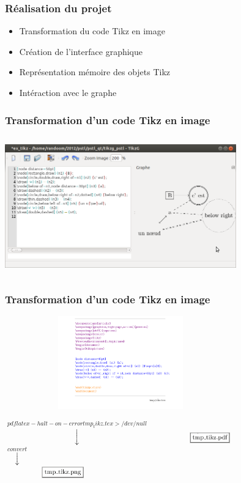 \documentclass{beamer}
\begin{document}
\begin{frame}
\frametitle{Réalisation du projet} 


\begin{itemize}

\pause \item Transformation du code Tikz en image

\pause \item Création de l'interface graphique

\pause \item Représentation mémoire des objets Tikz

\pause \item Intéraction avec le graphe

\end{itemize}

\end{frame}

\begin{frame}
\frametitle{Transformation d'un code Tikz en image}
\centering
\includegraphics[width=10cm, height=6cm]{img/r_1.png}
\end{frame}


\begin{frame}
\frametitle{Transformation d'un code Tikz en image}
\includegraphics[width=10cm, height=4cm]{img/c1.png} \\
\begin{center}
$\overset{pdflatex -halt-on-error tmp_tikz.tex > /dev/null}{\downarrow}$
\includegraphics[width=5cm, height=0.5cm]{img/re1.png} \\
$\overset{convert}{\downarrow}$ \\
\includegraphics[width=5cm, height=0.5cm]{img/re2.png} \\
\end{center}

\end{frame}
\end{document}
